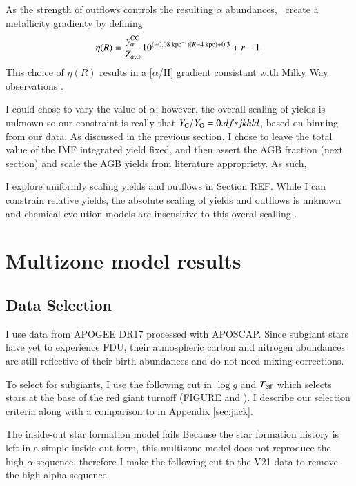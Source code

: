 \documentclass[12pt,oneside]{report}
\newcommand{\JJ}{\citetalias{james+21}}
\begin{document}
As the strength of outflows controls the resulting $\alpha$ abundances, \JJ~create a metallicity gradienty by defining
\begin{equation}
\eta(R) = \frac{y_{\alpha}^{\rm CC}}{Z_{\alpha, \odot}} 10^{(-0.08\text{ kpc}^{-1})(R-4\text{ kpc})+0.3} + r - 1.
\end{equation}
This choice of $\eta(R)$ results in a [$\alpha$/H] gradient consistant with Milky Way observations \citep{james+21}.

I could chose to vary the value of $\alpha$; however, the overall scaling of
yields is unknown so our constraint is really that $Y_{\rm C}/Y_{\rm O} =
0.dfsjkhld$, based on binning from our data. As discussed in the previous
section, I chose to leave the total value of the IMF integrated yield fixed,
and then assert the AGB fraction (next section) and scale the AGB yields from
literature appropriety. As such, 

I explore uniformly scaling yields and outflows in Section REF. While I can constrain relative yields, the absolute scaling of yields and outflows is unknown and chemical evolution models are insensitive to this overal scalling \citep[e.g.][]{james_dwarf}.


\chapter{Multizone model results}
\section{Data Selection}

I use data from APOGEE DR17 \citep{apogee17} processed with APOSCAP. Since subgiant stars have yet to experience FDU, their atmospheric carbon and nitrogen abundances are still reflective of their birth abundances and do not need mixing corrections. 

To select for subgiants, I use the following cut in $\log g$ and $T_{\rm eff}$
which selects stars at the base of the red giant turnoff (FIGURE and
\cite{jack_subgiant}). I describe our selection criteria along with a 
comparison to \citet{fiorenzo+21} in Appendix \ref{sec:jack}. 

The inside-out star formation model fails
Because the star formation history is left in a simple inside-out form, this multizone model does not reproduce the high-$\alpha$ sequence, therefore I make the following cut to the V21 data to remove the high alpha sequence.
\end{document}
